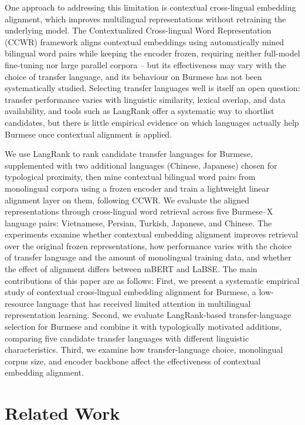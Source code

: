 \documentclass[11pt]{article}
\begin{document}
One approach to addressing this limitation is contextual cross-lingual embedding alignment, which improves multilingual representations without retraining the underlying model. The Contextualized Cross-lingual Word Representation (CCWR) \citep{hangya-etal-2022-improving} framework aligns contextual embeddings using automatically mined bilingual word pairs while keeping the encoder frozen, requiring neither full-model fine-tuning nor large parallel corpora -- but its effectiveness may vary with the choice of transfer language, and its behaviour on Burmese has not been systematically studied. Selecting transfer languages well is itself an open question: transfer performance varies with linguistic similarity, lexical overlap, and data availability, and tools such as LangRank \citep{lin-etal-2019-choosing} offer a systematic way to shortlist candidates, but there is little empirical evidence on which languages actually help Burmese once contextual alignment is applied.

We use LangRank to rank candidate transfer languages for Burmese, supplemented with two additional languages (Chinese, Japanese) chosen for typological proximity, then mine contextual bilingual word pairs from monolingual corpora using a frozen encoder and train a lightweight linear alignment layer on them, following CCWR. We evaluate the aligned representations through cross-lingual word retrieval
across five Burmese--X language pairs: Vietnamese, Persian, Turkish, Japanese,
and Chinese. The experiments examine whether contextual embedding alignment
improves retrieval over the original frozen representations, how performance
varies with the choice of transfer language and the amount of monolingual
training data, and whether the effect of alignment differs between mBERT and
LaBSE.
The main contributions of this paper are as follows: First, we present a systematic empirical study of contextual cross-lingual embedding alignment for Burmese, a low-resource language that has received limited attention in multilingual representation learning. Second, we evaluate LangRank-based transfer-language selection for Burmese and combine it with typologically motivated additions, comparing five candidate transfer languages with different linguistic characteristics. Third, we examine how transfer-language choice, monolingual corpus size, and encoder backbone
affect the effectiveness of contextual embedding alignment.

\section{Related Work}
\end{document}
